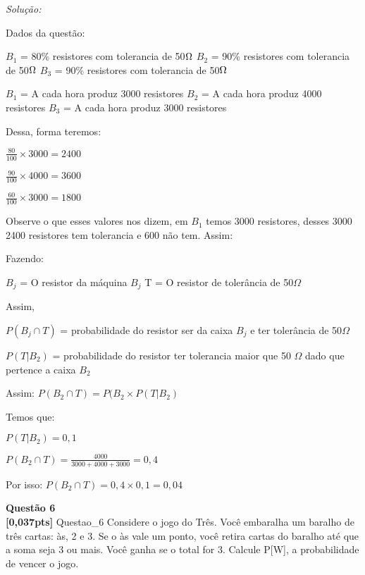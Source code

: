 \documentclass{article}
\newenvironment{problem}[2][Questão]
    { \begin{mdframed}[backgroundcolor=gray!20] \textbf{#1 #2} \\}
    {  \end{mdframed}}
\newenvironment{solution}
    {\textit{Solução:}}
    {}
\begin{document}
\begin{solution}

Dados da questão:

\noindent $B_{1}$ = 80\% resistores com tolerancia de 50$\Omega \newline$
$B_{2}$ = 90\% resistores com tolerancia de 50$\Omega \newline$
$B_{3}$ = 90\% resistores com tolerancia de 50$\Omega \newline$

\noindent $B_{1}$ = A cada hora produz 3000 resistores \newline
$B_{2}$ = A cada hora produz 4000 resistores \newline
$B_{3}$ = A cada hora produz 3000 resistores \newline

Dessa, forma teremos:

$\frac{80}{100} \times 3000 = 2400$ \newline

$\frac{90}{100} \times 4000 = 3600$ \newline

$\frac{60}{100} \times 3000 = 1800$ \newline

Observe o que esses valores nos dizem, em $B_{1}$ temos 3000 resistores, desses 3000 2400 resistores tem tolerancia e 600 não tem. Assim:

Fazendo:

\noindent $B_{j}$ = O resistor da máquina $B_{j}$ \newline
T = O resistor de tolerância de 50$\Omega$

Assim, 

$P(B_{j} \cap T)$ = probabilidade do resistor ser da caixa $B_{j}$ e ter tolerância de 50$\Omega$ 

$P(T|B_{2})$ = probabilidade do resistor ter tolerancia maior que 50 $\Omega$ dado que pertence a caixa $B_{2}$

Assim: $P(B_{2} \cap T) = P(B_{2} \times P(T|B_{2})$

Temos que: 

$P(T|B_{2})= 0,1$ 

$P(B_{2} \cap T) = \frac{4000}{3000+4000+3000} = 0,4$ \newline

Por isso: $P(B_{2} \cap T) = 0,4 \times 0,1 = 0,04$
\end{solution}


\begin{problem}{6}
\textbf{[0,037pts]} Questao\_6 Considere o jogo do Três. Você embaralha um baralho de três cartas: às, 2 e 3. Se o às vale um ponto, você retira cartas do baralho até que a soma seja 3 ou mais. Você ganha se o total for 3. Calcule P[W], a probabilidade de vencer o jogo.

\end{problem}
\end{document}

